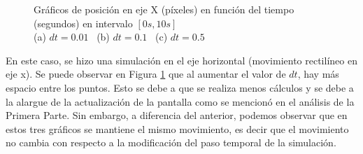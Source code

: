 \documentclass[12pt, a4paper]{article}
\begin{document}
\begin{figure}[H]
    \centering
    \captionsetup{justification=centering}
    \hfill
    \caption{Gráficos de posición en eje X (píxeles) en función del tiempo (segundos) en intervalo $[0s, 10s]$\\ (a) $dt=0.01$ \, (b) $dt=0.1$ \, (c) $dt=0.5$}
    \label{fig:part2a}
\end{figure}

En este caso, se hizo una simulación en el eje horizontal (movimiento rectilíneo en eje x). Se puede observar en Figura \ref{fig:part2a} que al aumentar el valor de $dt$, hay más espacio entre los puntos. Esto se debe a que se realiza menos cálculos y se debe a la alargue de la actualización de la pantalla como se mencionó en el análisis de la Primera Parte. Sin embargo, a diferencia del anterior, podemos observar que en estos tres gráficos se mantiene el mismo movimiento, es decir que el movimiento no cambia con respecto a la modificación del paso temporal de la simulación. 
\end{document}
